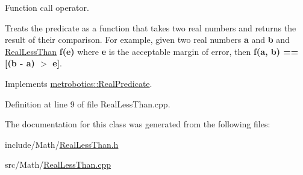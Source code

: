 \-Function call operator. 

\-Treats the predicate as a function that takes two real numbers and returns the result of their comparison. \-For example, given two real numbers {\bfseries a} and {\bfseries b} and {\ttfamily \hyperlink{classmetrobotics_1_1RealLessThan}{\-Real\-Less\-Than}} {\bfseries f(e)} where {\bfseries e} is the acceptable margin of error, then {\bfseries f(a, b) == \mbox{[}(b -\/ a) $>$ e\mbox{]}}. 

\-Implements \hyperlink{classmetrobotics_1_1RealPredicate_aff9d2e8629a14fcf743ff36c221e08bd}{metrobotics\-::\-Real\-Predicate}.



\-Definition at line 9 of file \-Real\-Less\-Than.\-cpp.



\-The documentation for this class was generated from the following files\-:\begin{DoxyCompactItemize}
\item 
include/\-Math/\hyperlink{RealLessThan_8h}{\-Real\-Less\-Than.\-h}\item 
src/\-Math/\hyperlink{RealLessThan_8cpp}{\-Real\-Less\-Than.\-cpp}\end{DoxyCompactItemize}
